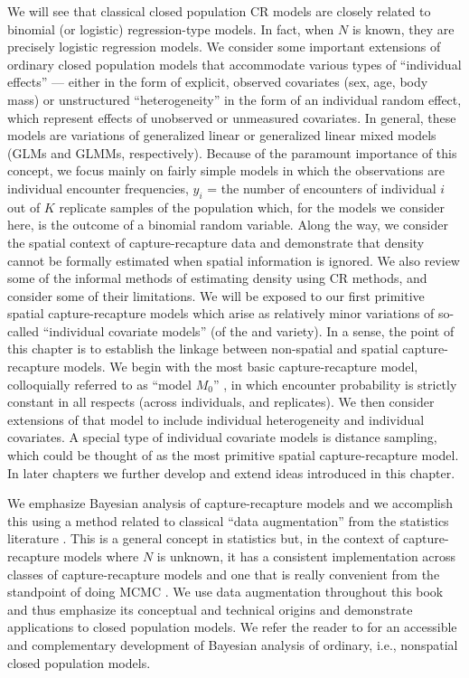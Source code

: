 We will
see that classical closed population CR models are closely related to binomial (or logistic)
regression-type models. In fact, when $N$ is known, they are precisely
logistic regression models.  We consider some important extensions of ordinary closed
population models that accommodate various types of ``individual
effects'' --- either in the form of explicit, observed %
covariates (sex, age,
body mass) or unstructured ``heterogeneity'' in the form of an
individual random effect, which represent effects of unobserved or
unmeasured covariates. In general, these models are variations of
generalized linear or generalized linear mixed models (GLMs and GLMMs, respectively).
Because of the paramount importance of this concept, we focus mainly
on fairly simple models in which the observations are individual
encounter frequencies, $y_{i}$ = the number of encounters of
individual $i$ out of $K$ replicate samples of the population which,
for the models we consider here, is the outcome of a binomial random
variable.  Along the way, we consider the spatial context of
capture-recapture data %
and demonstrate that density cannot
be formally estimated when spatial information is ignored. We also
review some of the informal methods of estimating density using CR
methods, and consider some of their limitations.  We will be exposed
to our first primitive spatial capture-recapture models which arise as
relatively minor variations of so-called ``individual covariate
models'' (of the \citet{huggins:1989} and \citet{alho:1990}
variety). In a sense, the point of this chapter is to establish the 
linkage  between non-spatial and spatial capture-recapture models.
We begin with the most basic
 capture-recapture model, colloquially referred to as ``model $M_0$''
 \citep{otis_etal:1978}, in which encounter probability is strictly
 constant in all respects (across individuals, and replicates). We
 then consider 
 extensions of that model to include individual
heterogeneity and individual covariates. A special type of
individual covariate models is distance sampling, which could be
thought of as the most primitive spatial capture-recapture model. In
later chapters we further develop and extend ideas introduced in this
chapter.

We emphasize Bayesian analysis of capture-recapture models and we
accomplish this using a method related to classical ``data
augmentation'' from the statistics literature
\citep[e.g.,][]{tanner_wong:1987}.  This is a general concept in
statistics but, in the context of capture-recapture models where $N$
is unknown, it has a consistent implementation across classes of
capture-recapture models and one that is really convenient from the
standpoint of doing MCMC \citep{royle_etal:2007,royle_dorazio:2012}. We use data
augmentation throughout this book and thus emphasize its conceptual
and technical origins and demonstrate applications to closed
population models.  We refer the reader to
\citet[][ch. 6]{kery_schaub:2011} for an accessible and complementary
development of Bayesian analysis of ordinary, i.e., nonspatial closed population models.



